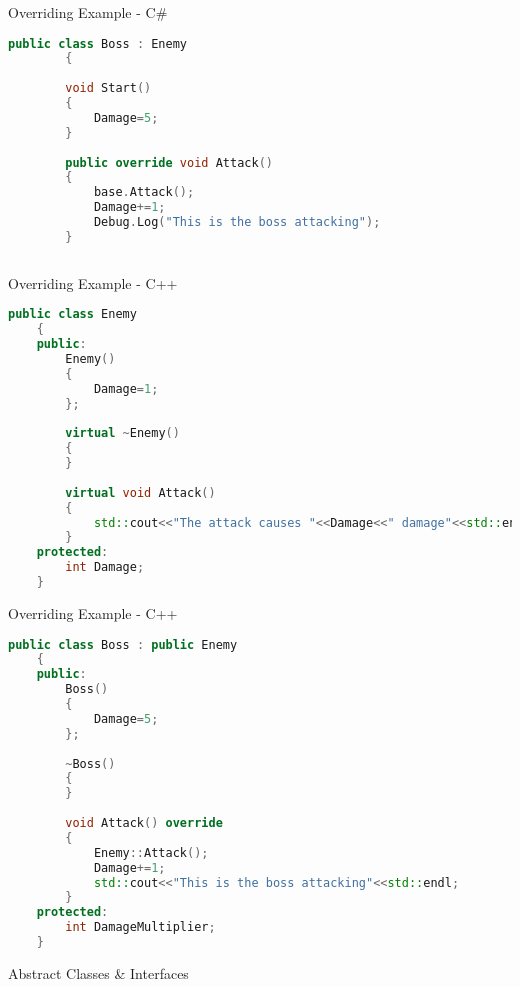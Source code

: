 \begin{frame}[fragile]{Overriding Example - C\#}
	\begin{lstlisting}[language=C++,basicstyle=\tiny,]
		public class Boss : Enemy
		{
		
		void Start()
		{
			Damage=5;
		}
		
		public override void Attack()
		{
			base.Attack();
			Damage+=1;
			Debug.Log("This is the boss attacking");
		}
		
	\end{lstlisting}
\end{frame}

\begin{frame}[fragile]{Overriding Example - C++}
	\begin{lstlisting}[language=C++,basicstyle=\tiny,]
	public class Enemy
	{
	public:
		Enemy()
		{
			Damage=1;
		};
		
		virtual ~Enemy()
		{
		}
	
		virtual void Attack()
		{
			std::cout<<"The attack causes "<<Damage<<" damage"<<std::endl;
		}
	protected:
		int Damage;
	}
	\end{lstlisting}
\end{frame}

\begin{frame}[fragile]{Overriding Example - C++}
	\begin{lstlisting}[language=C++,basicstyle=\tiny,]
	public class Boss : public Enemy
	{
	public:
		Boss()
		{
			Damage=5;
		};
	
		~Boss()
		{
		}
	
		void Attack() override
		{
			Enemy::Attack();
			Damage+=1;
			std::cout<<"This is the boss attacking"<<std::endl;
		}	
	protected:
		int DamageMultiplier;
	}
	\end{lstlisting}
\end{frame}

\begin{frame}{Abstract Classes \& Interfaces}
\end{frame}
